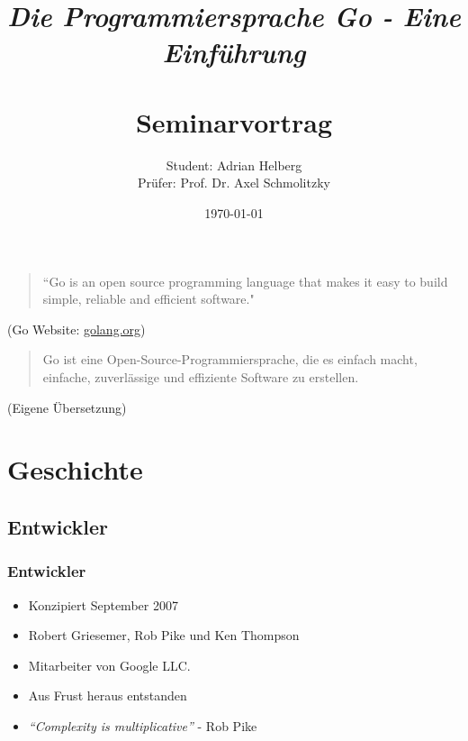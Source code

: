 \documentclass{beamer}
\title{
	\Large{\textit{\\Die Programmiersprache Go - Eine Einf\"uhrung}} \\
	\Large{\textbf{\\Seminarvortrag}}
}
\author{Student: Adrian Helberg \\Prüfer: Prof. Dr. Axel Schmolitzky}
\date{\today}
\begin{document}

\maketitle

\frame{\tableofcontents}

\begin{frame}

\begin{quote}
``Go is an open source programming language that makes it easy to build simple, reliable and efficient software." 
\end{quote}

\begin{flushright}
\scriptsize (Go Website: \href{golang.org}{golang.org})
\end{flushright}

\begin{quote}
Go ist eine Open-Source-Programmiersprache, die es einfach macht, einfache, zuverlässige und effiziente Software zu erstellen.
\end{quote}

\begin{flushright}
\scriptsize (Eigene \"Ubersetzung)
\end{flushright}

\end{frame}

\section{Geschichte}
\subsection{Entwickler}
\begin{frame}
\frametitle{Entwickler}

\begin{itemize}
\setlength{\itemsep}{24pt}
\item Konzipiert September 2007
\item Robert Griesemer, Rob Pike und Ken Thompson
\item Mitarbeiter von Google LLC. \textregistered
\item Aus Frust heraus entstanden
\item \textit{``Complexity is multiplicative''} - Rob Pike
\end{itemize}

\end{frame}
\end{document}
